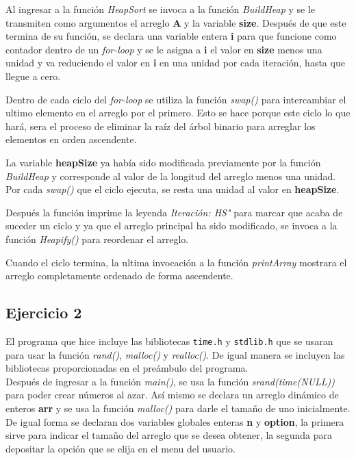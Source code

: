\documentclass{article}
\begin{document}
\begin{itemize}
				Al ingresar a la función \emph{HeapSort} se invoca a la función \emph{BuildHeap} y se le transmiten como argumentos el arreglo \textbf{A} y la variable \textbf{size}. Después de que este termina de su función, se declara una variable entera \textbf{i} para que funcione como contador dentro de un \emph{for-loop} y se le asigna a \textbf{i} el valor en \textbf{size} menos una unidad y va reduciendo el valor en \textbf{i} en una unidad por cada iteración, hasta que llegue a cero.
				
				Dentro de cada ciclo del \emph{for-loop} se utiliza la función \emph{swap()} para intercambiar el ultimo elemento en el arreglo por el primero. Esto se hace porque este ciclo lo que hará, sera el proceso de eliminar la raíz del árbol binario para arreglar los elementos en orden ascendente.
				
				La variable \textbf{heapSize} ya había sido modificada previamente por la función \emph{BuildHeap} y corresponde al valor de la longitud del arreglo menos una unidad. Por cada \emph{swap()} que el ciclo ejecuta, se resta una unidad al valor en \textbf{heapSize}.
				
				Después la función imprime la leyenda \emph{Iteración: HS"} para marcar que acaba de suceder un ciclo y ya que el arreglo principal ha sido modificado, se invoca a la función \emph{Heapify()} para reordenar el arreglo.
				
				Cuando el ciclo termina, la ultima invocación a la función \emph{printArray} mostrara el arreglo completamente ordenado de forma ascendente.
						
			\end{itemize}
			\newpage
		
		\subsection{Ejercicio 2}
					
		El programa que hice incluye las bibliotecas \verb*|time.h| y \verb*|stdlib.h| que se usaran para usar la función \emph{rand()}, \emph{malloc()} y \emph{realloc()}. De igual manera se incluyen las bibliotecas proporcionadas en el preámbulo del programa.\\
		
		Después de ingresar a la función \emph{main()}, se usa la función \emph{srand(time(NULL))} para poder crear números al azar. Así mismo se declara un arreglo dinámico de enteros \textbf{arr} y se usa la función \emph{malloc()} para darle el tamaño de uno inicialmente. De igual forma se declaran dos variables globales enteras \textbf{n} y \textbf{option}, la primera sirve para indicar el tamaño del arreglo que se desea obtener, la segunda para depositar la opción que se elija en el menu del usuario.\\
		
\end{document}
